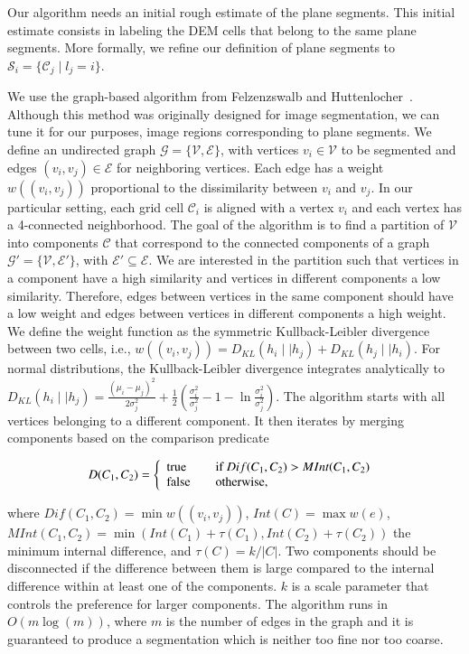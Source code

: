 Our algorithm needs an initial rough estimate of the plane segments. This
initial estimate consists in labeling the DEM cells that belong to the same
plane segments. More formally, we refine our definition of plane segments to
$\mathcal{S}_i=\{\mathcal{C}_j\mid l_j=i\}$.

We use the graph-based algorithm from Felzenzswalb and
Huttenlocher~\cite{felzenszwalb04efficient}. Although this method was originally
designed for image segmentation, we can tune it for our purposes, image regions
corresponding to plane segments. We define an undirected graph
$\mathcal{G}=\{\mathcal{V},\mathcal{E}\}$, with vertices $v_i\in\mathcal{V}$ to
be segmented and edges $(v_i,v_j)\in\mathcal{E}$ for neighboring vertices. Each
edge has a weight $w((v_i,v_j))$ proportional to the dissimilarity between $v_i$
and $v_j$. In our particular setting, each grid cell $\mathcal{C}_i$ is aligned
with a vertex $v_i$ and each vertex has a 4-connected neighborhood. The goal of
the algorithm is to find a partition of $\mathcal{V}$ into components
$\mathcal{C}$ that correspond to the connected components of a graph
$\mathcal{G}'=\{\mathcal{V},\mathcal{E}'\}$, with
$\mathcal{E}'\subseteq\mathcal{E}$. We are interested in the partition such that
vertices in a component have a high similarity and vertices in different
components a low similarity. Therefore, edges between vertices in the same
component should have a low weight and edges between vertices in different
components a high weight. We define the weight function as the symmetric
Kullback-Leibler divergence between two cells, i.e.,
$w((v_i,v_j))=D_{KL}(h_i\mid\mid h_j)+D_{KL}(h_j\mid\mid h_i)$. For normal
distributions, the Kullback-Leibler divergence integrates analytically to
$D_{KL}(h_i\mid\mid h_j)=\frac{(\mu_i-\mu_j)^2}{2\sigma_j^2}+\frac{1}{2}
(\frac{\sigma_i^2}{\sigma_j^2}-1-\ln\frac{\sigma_i^2}{\sigma_j^2})$. The
algorithm starts with all vertices belonging to a different component. It then
iterates by merging components based on the comparison predicate

\begin{equation}
\label{eqn:comp_pred}
D(C_1,C_2) = \left\{
\begin{array}{l l}
\text{true} & \quad \text{if $Dif(C_1,C_2)>MInt(C_1,C_2)$ }\\
\text{false} & \quad \text{otherwise},
\end{array} \right.
\end{equation}

where $Dif(C_1,C_2)=\min w((v_i,v_j))$, $Int(C)=\max w(e)$,
$MInt(C_1,C_2)=\min(Int(C_1)+\tau(C_1),Int(C_2)+\tau(C_2))$ the minimum internal
difference, and $\tau(C)=k/|C|$. Two components should be disconnected if the
difference between them is large compared to the internal difference within at
least one of the components. $k$ is a scale parameter that controls the
preference for larger components. The algorithm runs in $O(m\log(m))$, where
$m$ is the number of edges in the graph and it is guaranteed to produce a
segmentation which is neither too fine nor too coarse.

